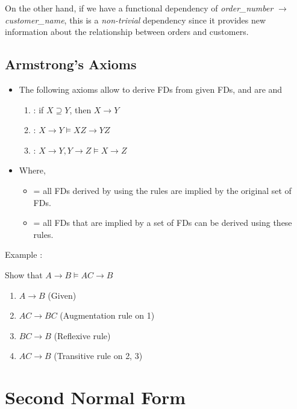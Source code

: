 On the other hand, if we have a functional dependency of \textit{order\_number} $\rightarrow$ \textit{customer\_name}, this is a \textit{non-trivial} dependency since it provides new information about the relationship between orders and customers.

\subsection{Armstrong's Axioms}

\begin{itemize}
    \item The following axioms allow to derive FDs from given FDs, and are  and 
    \begin{enumerate}
        \item {} : if $X \supseteq Y$, then $X \rightarrow Y$
        \item {} : $X \rightarrow Y \models XZ \rightarrow YZ$
        \item {} : $X \rightarrow Y, Y \rightarrow Z \models X \rightarrow Z$
    \end{enumerate}
    \item Where,
    \begin{itemize}
        \item {} = all FDs derived by using the rules are implied by the original set of FDs.
        \item {} = all FDs that are implied by a set of FDs can be derived using these rules.
    \end{itemize}
\end{itemize}

Example :

Show that $A \rightarrow B \models AC \rightarrow B$

\begin{enumerate}
    \item $A \rightarrow B$ (Given)
    \item $AC \rightarrow BC$ (Augmentation rule on 1)
    \item $BC \rightarrow B$ (Reflexive rule)
    \item $AC \rightarrow B$ (Transitive rule on 2, 3)
\end{enumerate}

\section{Second Normal Form}

